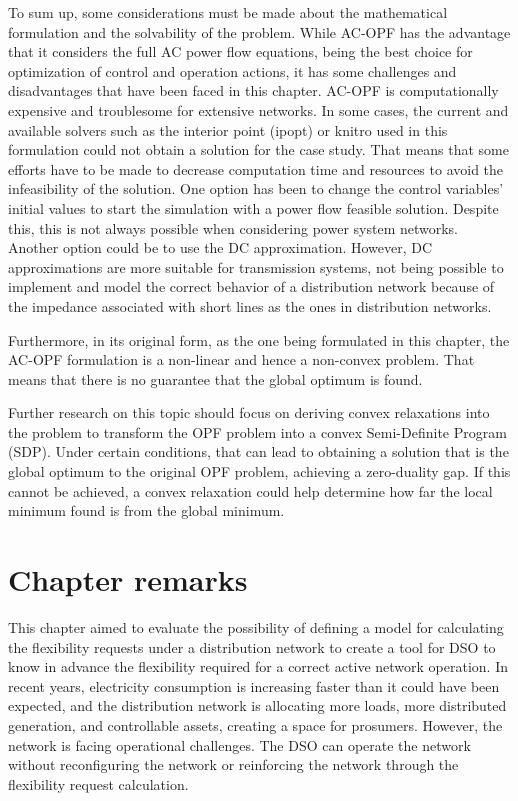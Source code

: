 To sum up, some considerations must be made about the mathematical formulation and the solvability of the problem. While AC-OPF has the advantage that it considers the full AC power flow equations, being the best choice for optimization of control and operation actions, it has some challenges and disadvantages that have been faced in this chapter. AC-OPF is computationally expensive and troublesome for extensive networks. In some cases, the current and available solvers such as the interior point (ipopt) or knitro used in this formulation could not obtain a solution for the case study. That means that some efforts have to be made to decrease computation time and resources to avoid the infeasibility of the solution. One option has been to change the control variables' initial values to start the simulation with a power flow feasible solution. Despite this, this is not always possible when considering power system networks. Another option could be to use the DC approximation. However, DC approximations are more suitable for transmission systems, not being possible to implement and model the correct behavior of a distribution network because of the impedance associated with short lines as the ones in distribution networks. 

Furthermore, in its original form, as the one being formulated in this chapter, the AC-OPF formulation is a non-linear and hence a non-convex problem. That means that there is no guarantee that the global optimum is found. 

Further research on this topic should focus on deriving convex relaxations into the problem to transform the OPF problem into a convex Semi-Definite Program (SDP). Under certain conditions, that can lead to obtaining a solution that is the global optimum to the original OPF problem, achieving a zero-duality gap. If this cannot be achieved, a convex relaxation could help determine how far the local minimum found is from the global minimum.  

\section{Chapter remarks}
This chapter aimed to evaluate the possibility of defining a model for calculating the flexibility requests under a distribution network to create a tool for DSO to know in advance the flexibility required for a correct active network operation. In recent years, electricity consumption is increasing faster than it could have been expected, and the distribution network is allocating more loads, more distributed generation, and controllable assets, creating a space for prosumers. However, the network is facing operational challenges. The DSO can operate the network without reconfiguring the network or reinforcing the network through the flexibility request calculation.

